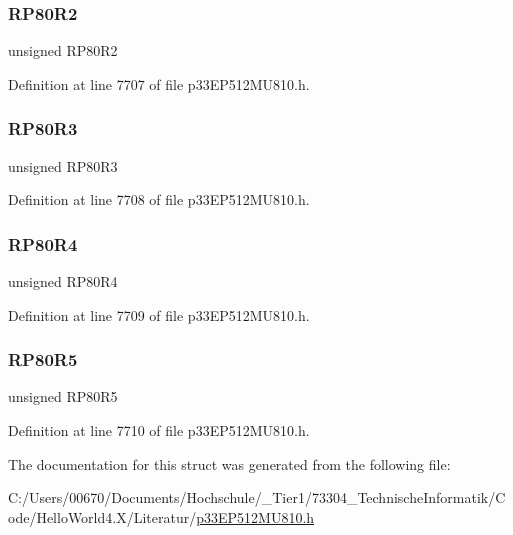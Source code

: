 \subsubsection{\texorpdfstring{R\+P80\+R2}{RP80R2}}
{\footnotesize\ttfamily unsigned R\+P80\+R2}



Definition at line 7707 of file p33\+E\+P512\+M\+U810.\+h.

\mbox{\label{structtag_r_p_o_r4_b_i_t_s_ae167d32e65ce719a560059db89831799}} 
\subsubsection{\texorpdfstring{R\+P80\+R3}{RP80R3}}
{\footnotesize\ttfamily unsigned R\+P80\+R3}



Definition at line 7708 of file p33\+E\+P512\+M\+U810.\+h.

\mbox{\label{structtag_r_p_o_r4_b_i_t_s_aef494fba91a3032ddbdbede8247f2a97}} 
\subsubsection{\texorpdfstring{R\+P80\+R4}{RP80R4}}
{\footnotesize\ttfamily unsigned R\+P80\+R4}



Definition at line 7709 of file p33\+E\+P512\+M\+U810.\+h.

\mbox{\label{structtag_r_p_o_r4_b_i_t_s_a42bad3c23730a336a923bf4ed016fa53}} 
\subsubsection{\texorpdfstring{R\+P80\+R5}{RP80R5}}
{\footnotesize\ttfamily unsigned R\+P80\+R5}



Definition at line 7710 of file p33\+E\+P512\+M\+U810.\+h.



The documentation for this struct was generated from the following file\+:\begin{DoxyCompactItemize}
\item 
C\+:/\+Users/00670/\+Documents/\+Hochschule/\+\_\+\+Tier1/73304\+\_\+\+Technische\+Informatik/\+Code/\+Hello\+World4.\+X/\+Literatur/\hyperlink{p33_e_p512_m_u810_8h}{p33\+E\+P512\+M\+U810.\+h}\end{DoxyCompactItemize}
